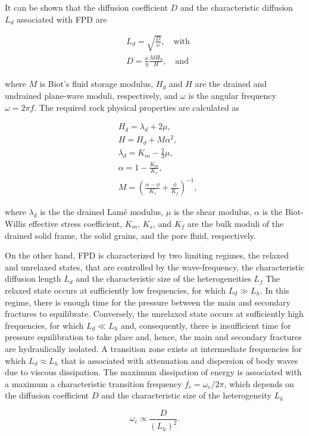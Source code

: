 \documentclass[draft]{agujournal2019}
\begin{document}
It can be shown that the diffusion coefficient $D$ and the characteristic diffusion $L_d$ associated with FPD are \cite{Chandler1981, Norris1993}
\begin{linenomath*}
\begin{equation}\label{Eq.3}
\begin{split}
&L_d=\sqrt{\frac{D}{\omega}},\quad \text{with} \\
&D= \frac {\kappa} {\eta} \frac{M H_d}{H},
 \quad \text{and}  
\end{split}
\end{equation}
\end{linenomath*}
where $M$ is Biot’s fluid storage modulus, $H_d$ and $H$ are the drained and undrained plane-wave moduli, respectively, and $\omega$ is the angular frequency $\omega = 2 \pi f$.        
The required rock physical properties are calculated as
\begin{linenomath*}
\begin{equation}\label{Eq.4}
\begin{split}
& H_d = \lambda_d + 2 \mu, \\
& H = H_d + M \alpha ^2, \\
& \lambda_d= K_m - \frac{2}{3} \mu, \\
& \alpha =1-\frac{K_m}{K_s},\\
& M  =\left( \frac{\alpha-\phi}{K_s} +\frac{\phi}{K_f} \right)^{-1},
\end{split}
\end{equation}
\end{linenomath*}
where $\lambda_d$ is the the drained Lamé modulus, $\mu$ is the shear modulus, $\alpha$ is the Biot-Willis effective stress coefficient, $K_m$, $K_s$, and $K_f$ are the bulk moduli of the drained solid frame, the solid grains, and the pore fluid, respectively.

On the other hand, FPD is characterized by two limiting regimes, the relaxed and unrelaxed states, that are controlled by the wave-frequency, the characteristic diffusion length $L_d$ and the characteristic size of the heterogeneities $L_f$ 
The relaxed state occurs at sufficiently low frequencies, for which  $L_d \gg L_h$. In this regime, there is enough time for the pressure between the main and secondary fractures to equilibrate. Conversely, the unrelaxed state occurs at sufficiently high frequencies, for which $L_d \ll L_h$ and, consequently, there is insufficient time for pressure equilibration to take place and, hence, the main and secondary fractures are hydraulically isolated. A transition zone exists at intermediate frequencies for which $L_d \approx L_h$ that is associated with attenuation and dispersion of body waves due to viscous dissipation. The maximum dissipation of energy is associated with a maximum a characteristic transition frequency $f_c= \omega_c/2\pi$, 
which depends on the diffusion coefficient $D$ and the characteristic size of the heterogeneity $L_h$ \cite{Rubino2014}
\begin{linenomath*}
\begin{equation}\label{Eq.5}
\omega_c \propto \frac{D}{(L_h)^2}.
\end{equation}
\end{linenomath*}
\end{document}

